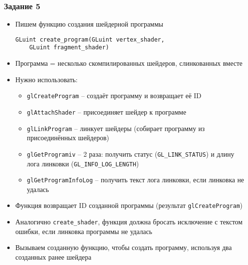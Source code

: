 \documentclass{beamer}
\begin{document}
\begin{frame}[fragile]
\frametitle{Задание 5}
\fontsize{8pt}{8pt}\selectfont
\begin{itemize}
\item Пишем функцию создания шейдерной программы
\begin{verbatim}
GLuint create_program(GLuint vertex_shader,
    GLuint fragment_shader)
\end{verbatim}
\item Программа = несколько скомпилированных шейдеров, слинкованных вместе
\item Нужно использовать:
\begin{itemize}
\item \verb|glCreateProgram| -- создаёт программу и возвращает её ID
\item \verb|glAttachShader| -- присоединяет шейдер к программе
\item \verb|glLinkProgram| -- линкует шейдеры (собирает программу из присоединённых шейдеров)
\item \verb|glGetProgramiv| -- 2 раза: получить статус (\verb|GL_LINK_STATUS|) и длину лога линковки (\verb|GL_INFO_LOG_LENGTH|)
\item \verb|glGetProgramInfoLog| -- получить текст лога линковки, если линковка не удалась
\end{itemize}
\item Функция возвращает ID созданной программы (результат \verb|glCreateProgram|)
\item Аналогично \verb|create_shader|, функция должна бросать исключение с текстом ошибки, если линковка программы не удалась
\item Вызываем созданную функцию, чтобы создать программу, используя два созданных ранее шейдера
\end{itemize}
\end{frame}
\end{document}
